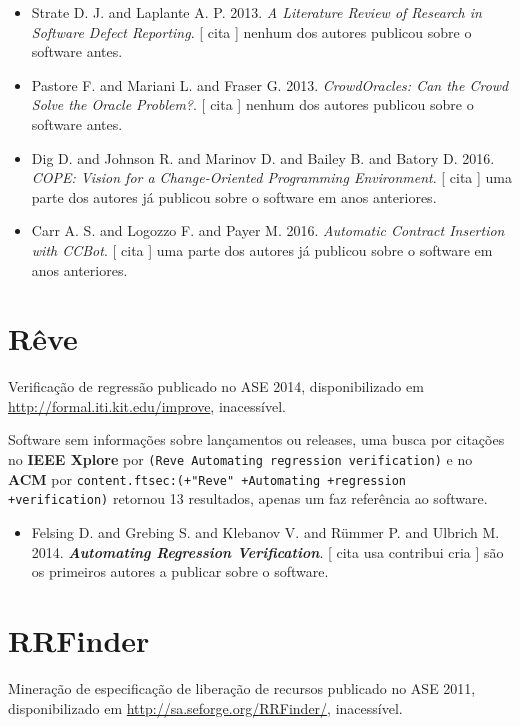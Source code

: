 \begin{itemize}
\item Strate D. J. and Laplante A. P.
      2013.
        \textit{ A Literature Review of Research in Software Defect Reporting}.
      [
          cita
      ]
nenhum dos autores publicou sobre o software antes.
\item Pastore F. and Mariani L. and Fraser G.
      2013.
        \textit{ CrowdOracles: Can the Crowd Solve the Oracle Problem?}.
      [
          cita
      ]
nenhum dos autores publicou sobre o software antes.
\item Dig D. and Johnson R. and Marinov D. and Bailey B. and Batory D.
      2016.
        \textit{ COPE: Vision for a Change-Oriented Programming Environment}.
      [
          cita
      ]
uma parte dos autores já publicou sobre o software em anos anteriores.
\item Carr A. S. and Logozzo F. and Payer M.
      2016.
        \textit{ Automatic Contract Insertion with CCBot}.
      [
          cita
      ]
uma parte dos autores já publicou sobre o software em anos anteriores.
\end{itemize}
\section{Rêve}

Verificação de regressão
publicado no ASE 2014,
disponibilizado em \url{http://formal.iti.kit.edu/improve},
inacessível.

Software sem informações sobre lançamentos ou releases,
uma busca por citações no {\bf IEEE Xplore} por
\texttt{(Reve Automating regression verification)}
e no {\bf ACM} por
\texttt{content.ftsec:(+"Reve" +Automating +regression +verification)}
retornou
13 resultados,
apenas um faz referência ao software.

\begin{itemize}
\item Felsing D. and Grebing S. and Klebanov V. and R\"{u}mmer P. and Ulbrich M.
      2014.
        \textbf{\textit{ Automating Regression Verification}}.
      [
          cita
          usa
          contribui
          cria
      ]
são os primeiros autores a publicar sobre o software.
\end{itemize}
\section{RRFinder}

Mineração de especificação de liberação de recursos
publicado no ASE 2011,
disponibilizado em \url{http://sa.seforge.org/RRFinder/},
inacessível.

